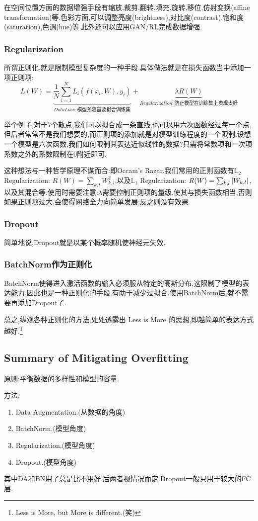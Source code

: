在空间位置方面的数据增强手段有缩放,裁剪,翻转,填充,旋转,移位,仿射变换(affine transformation)等.色彩方面,可以调整亮度(brightness),对比度(contrast),饱和度(saturation),色调(hue)等.此外还可以应用GAN/RL完成数据增强.

\subsubsection{Regularization}

所谓正则化,就是限制模型复杂度的一种手段.具体做法就是在损失函数当中添加一项正则项:
\begin{equation}
	L(W) = \underbrace{\frac{1}{N}\sum_{i=1}^{N} L_i(f(x_i, W), y_i) }_{Data Loss:\text{模型预测需要拟合训练集}} + \underbrace{\lambda R(W)}_{Regularization:\text{防止模型在训练集上}\textbf{表现太好}}
\end{equation}

举个例子,对于7个散点,我们可以拟合成一条直线,也可以用六次函数经过每一个点,但后者常常不是我们想要的,而正则项的添加就是对模型训练程度的一个限制.设想一个模型是六次函数,我们如何限制其表达近似线性的数据?只需将常数项和一次项系数之外的系数限制在0附近即可.

这种想法与一种哲学原理不谋而合:即Occam's Razar.我们常用的正则函数有$\mathbb L_2$ Regularization: $R(W) = \sum_{k,l}W_{k, l}^2$,以及$\mathbb L_1$ Regularization: $R(W) = \sum_{k,l}\left|W_{k, l} \right|$,以及其混合等.使用时需要注意:$\lambda$需要控制正则项的量级,使其与损失函数相当,否则如果正则项过大,会使得网络全力向简单发展;反之则没有效果.

\subsubsection{Dropout}
简单地说,Dropout就是以某个概率随机使神经元失效.

\subsubsection{BatchNorm作为正则化}
BatchNorm使得进入激活函数的输入必须服从特定的高斯分布,这限制了模型的表达能力,因此也是一种正则化的手段,有助于减少过拟合.使用BatchNorm后,就不需要再添加Dropout了.

总之,纵观各种正则化的方法,处处透露出 Less is More 的思想,即越简单的表达方式越好.\footnote{Less is More, but More is different.(笑)}

\subsection{Summary of Mitigating Overfitting}
原则:平衡数据的多样性和模型的容量.

方法:
\begin{enumerate}
	\item Data Augmentation.(从数据的角度)
	\item BatchNorm.(模型角度)
	\item Regularization.(模型角度)
	\item Dropout.(模型角度)
\end{enumerate}

其中DA和BN用了总是比不用好.后两者视情况而定.Dropout一般只用于较大的FC层.